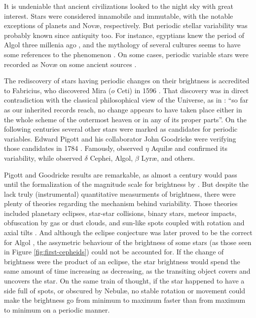 
It is undeniable that ancient civilizations looked to the night sky with great interest. 
Stars were considered innamobile and immutable, with the notable exceptions of planets and Nov\ae{}, respectively.
But periodic stellar variability was probably known since antiquity too.
For instance, egyptians knew the period of Algol three millenia ago \citep{Jetsu2013,Jetsu2015},
and the mythology of several cultures seems to have some references to the phenomenon \citep{Wilk1996}. 
On some cases, periodic variable stars were recorded as Nov\ae{} on some ancient sources \citep{HOPENGYOKE1962}.


The rediscovery of stars having periodic changes on their brightness is accredited to Fabricius, 
who discovered Mira ($o$ Ceti) in 1596 \citep{Hoffleit1997}.
That discovery was in direct contradiction with the classical philosophical view of the Universe, as in \cite[book I, part 3]{aristotle}: 
\enquote{so far as our inherited records reach, no change appears to have taken place either in the whole scheme of the outermost heaven or in any of its proper parts}.
On the following centuries several other stars were marked as candidates for periodic variables.
Edward Pigott and his collaborator John Goodricke were verifying those candidates in 1784 \citep{Hoskin1979}. 
Famously, \cite{Pigott1785} observed $\eta$ Aquil\ae{} and confirmed its variability, 
while \cite{Goodricke1786} observed $\delta$ Cephei, Algol, $\beta$ Lyr\ae{}, and others.



Pigott and Goodricke results are remarkable, as almost a century would pass until the formalization of the magnitude scale for brightness by \cite{Pogson1856}.
But despite the lack truly (instrumental) quantitative measurments of brightness, 
there were plenty of theories regarding the mechanism behind variability. 
Those theories included planetary eclipses, star-star collisions, binary stars, meteor impacts, 
obfuscation by gas or dust clouds, and sun-like spots coupled with rotation and axial tilts \citep{Hoffleit1993}. 
And although the eclipse conjecture was later proved to be the correct for Algol \citep{Pickering1880}, 
the assymetric behaviour of the brightness of some stars (as those seen in Figure \ref{fig:first-cepheids}) could not be accounted for.
If the change of brightness were the product of an eclipse,
the star brightness would spend the same amount of time increasing as decreasing,
as the transiting object covers and uncovers the star.
On the same train of thought, if the star happened to have a side full of spots, or obscured by Nebul\ae{},
no stable rotation or movement could make the brightness go from minimum to maximum faster than from maximum to minimum on a periodic manner.

